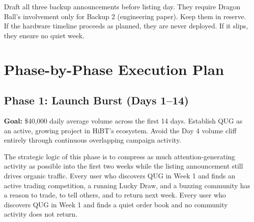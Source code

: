 \documentclass[11pt,a4paper]{article}
\begin{document}
Draft all three backup announcements before listing day. They require Dragon Ball's involvement only for Backup 2 (engineering paper). Keep them in reserve. If the hardware timeline proceeds as planned, they are never deployed. If it slips, they ensure no quiet week.

\section{Phase-by-Phase Execution Plan}

\subsection{Phase 1: Launch Burst (Days 1--14)}

\textbf{Goal:} \$40,000 daily average volume across the first 14 days. Establish QUG as an active, growing project in HiBT's ecosystem. Avoid the Day 4 volume cliff entirely through continuous overlapping campaign activity.

The strategic logic of this phase is to compress as much attention-generating activity as possible into the first two weeks while the listing announcement still drives organic traffic. Every user who discovers QUG in Week 1 and finds an active trading competition, a running Lucky Draw, and a buzzing community has a reason to trade, to tell others, and to return next week. Every user who discovers QUG in Week 1 and finds a quiet order book and no community activity does not return.
\end{document}
